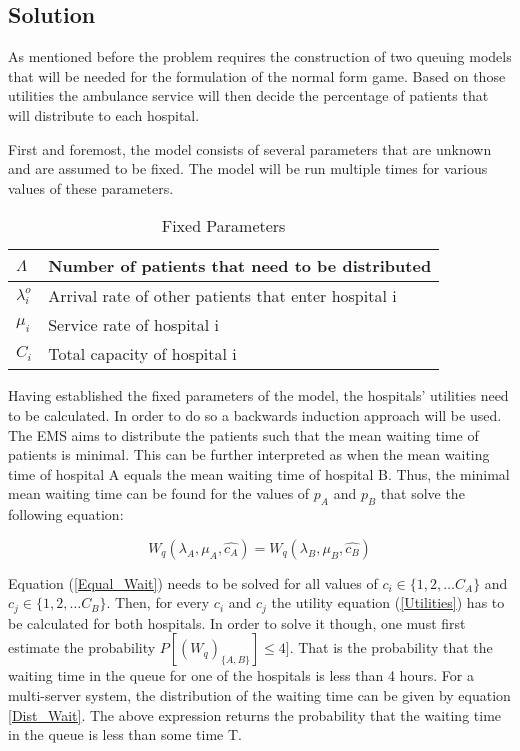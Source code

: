 \documentclass{article}
\begin{document}
\subsection{Solution}
As mentioned before the problem requires the construction of two queuing models that will be needed for the formulation of the normal form game. Based on those utilities the ambulance service will then decide the percentage of patients that will distribute to each hospital. 

First and foremost, the model consists of several parameters that are unknown and are assumed to be fixed. The model will be run multiple times for various values of these parameters.


\begin{table}[h]
    \centering
    \begin{tabular}{|l|l|}
        \hline
        $\Lambda$ & Number of patients that need to be distributed \\ \hline
        $\lambda_i^o$ & Arrival rate of other patients that enter hospital i \\ \hline
        $\mu_i$ & Service rate of hospital i \\ \hline
        $C_i$ & Total capacity of hospital i \\ \hline
    \end{tabular}
    \caption{Fixed Parameters}
\end{table}

Having established the fixed parameters of the model, the hospitals' utilities need to be calculated. In order to do so a backwards induction approach will be used. The EMS aims to distribute the patients such that the mean waiting time of patients is minimal. This can be further interpreted as when the mean waiting time of hospital A equals the mean waiting time of hospital B. Thus, the minimal mean waiting time can be found for the values of $p_A$ and $p_B$ that solve the following equation:

\begin{equation}\label{Equal_Wait}
    W_q(\lambda_A, \mu_A, \hat{c_A}) = W_q(\lambda_B, \mu_B, \hat{c_B})
\end{equation}

Equation (\ref{Equal_Wait}) needs to be solved for all values of $c_i \in \{1,2, \dots C_A\}$ and $c_j \in \{1,2, \dots C_B\}$. Then, for every $c_i$ and $c_j$ the utility equation (\ref{Utilities}) has to be calculated for both hospitals. In order to solve it though, one must first estimate the probability $P[(W_q)_{\{A, B\}}] \leq 4]$. That is the probability that the waiting time in the queue for one of the hospitals is less than 4 hours. For a multi-server system, the distribution of the waiting time can be given by equation \ref{Dist_Wait}. The above expression returns the probability that the waiting time in the queue is less than some time T.
\end{document}
